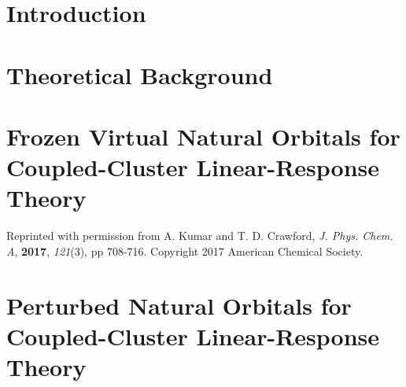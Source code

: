 \documentclass[12pt]{report}
\begin{document}
\tableofcontents
\pagebreak

\listoffigures
\pagebreak

\listoftables
\pagebreak

\pagestyle{myheadings}

\def\ket#1{| #1 \rangle}
\def\bra#1{\langle #1 |}
\def\bm#1{\mbox{\boldmath $#1$}}
\def\degrees{deg dm$^{-1}$ (g/mL)$^{-1}$}
\def\optrot{$[\alpha]$}
\def\crt#1{a_{#1}^{\dagger}}
\def\ann#1{a_{#1}^{\ }}
\def\cgs{($10^{-40}$ cgs)}


\chapter{Introduction}

\chapter{Theoretical Background}

\chapter{Frozen Virtual Natural Orbitals for Coupled-Cluster Linear-Response\\Theory}
Reprinted with permission from A. Kumar and T. D. Crawford, {\em J. Phys. Chem. A}, \textbf{2017}, {\em 121}(3), pp 708-716. Copyright 2017 American Chemical Society.

\chapter{Perturbed Natural Orbitals for Coupled-Cluster Linear-Response Theory}

\end{document}
